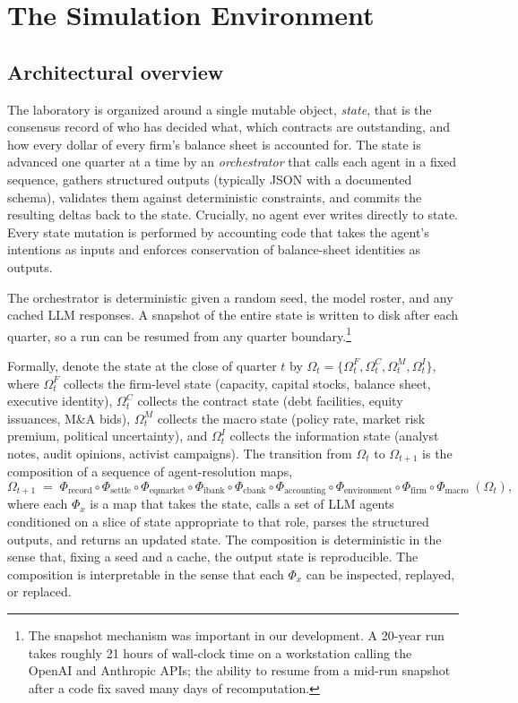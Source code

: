 \documentclass[11pt]{article}
\begin{document}
\section{The Simulation Environment}\label{sec:environment}

\subsection{Architectural overview}

The laboratory is organized around a single mutable object,
\textit{state}, that is the consensus record of who has decided what,
which contracts are outstanding, and how every dollar of every firm's
balance sheet is accounted for. The state is advanced one quarter at a
time by an \textit{orchestrator} that calls each agent in a fixed
sequence, gathers structured outputs (typically JSON with a documented
schema), validates them against deterministic constraints, and commits
the resulting deltas back to the state. Crucially, no agent ever writes
directly to state. Every state mutation is performed by accounting code
that takes the agent's intentions as inputs and enforces conservation of
balance-sheet identities as outputs.

The orchestrator is deterministic given a random seed, the model roster,
and any cached LLM responses. A snapshot of the entire state is written
to disk after each quarter, so a run can be resumed from any quarter
boundary.\footnote{The snapshot mechanism was important in our development.
A 20-year run takes roughly 21 hours of wall-clock time on a workstation
calling the OpenAI and Anthropic APIs; the ability to resume from a
mid-run snapshot after a code fix saved many days of recomputation.}

Formally, denote the state at the close of quarter $t$ by
$\Omega_t = \{\Omega_t^F, \Omega_t^C, \Omega_t^M, \Omega_t^I\}$, where
$\Omega_t^F$ collects the firm-level state (capacity, capital stocks,
balance sheet, executive identity), $\Omega_t^C$ collects the contract
state (debt facilities, equity issuances, M\&A bids), $\Omega_t^M$
collects the macro state (policy rate, market risk premium, political
uncertainty), and $\Omega_t^I$ collects the information state (analyst
notes, audit opinions, activist campaigns). The transition from
$\Omega_t$ to $\Omega_{t+1}$ is the composition of a sequence of
agent-resolution maps,
\[
\Omega_{t+1} \;=\; \Phi_{\text{record}} \circ
\Phi_{\text{settle}} \circ \Phi_{\text{eqmarket}} \circ
\Phi_{\text{ibank}} \circ \Phi_{\text{cbank}} \circ
\Phi_{\text{accounting}} \circ \Phi_{\text{environment}} \circ
\Phi_{\text{firm}} \circ \Phi_{\text{macro}} \;(\Omega_t),
\]
where each $\Phi_{x}$ is a map that takes the state, calls a set of LLM
agents conditioned on a slice of state appropriate to that role, parses
the structured outputs, and returns an updated state. The composition
is deterministic in the sense that, fixing a seed and a cache, the
output state is reproducible. The composition is interpretable in the
sense that each $\Phi_x$ can be inspected, replayed, or replaced.
\end{document}
